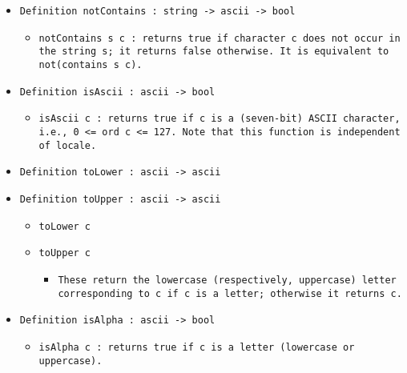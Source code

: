 \documentclass[11pt]{report}
\begin{document}
\begin{itemize}
\item  \texttt{Definition notContains : string -> ascii -> bool}

\begin{itemize}
\item  \begin{flushleft} \texttt{notContains s c : returns true if character c does not occur in the string s; it returns false otherwise. It is equivalent to not(contains s c).} \end{flushleft}
\end{itemize}

\item  \texttt{Definition isAscii : ascii -> bool}

\begin{itemize}
\item  \begin{flushleft} \texttt{isAscii c : returns true if c is a (seven-bit) ASCII character, i.e., 0 <= ord c <= 127. Note that this function is independent of locale.} \end{flushleft}
\end{itemize}

\item  \texttt{Definition toLower : ascii -> ascii}

\item  \texttt{Definition toUpper : ascii -> ascii}

\begin{itemize}
\item  \texttt{toLower c}
\item  \texttt{toUpper c}
\begin{itemize}
\item \begin{flushleft} \texttt{These return the lowercase (respectively, uppercase) letter corresponding to c if c is a letter; otherwise it returns c.} \end{flushleft}
\end{itemize}

\end{itemize}

\item  \texttt{Definition isAlpha : ascii -> bool}

\begin{itemize}
\item  \texttt{isAlpha c :  returns true if c is a letter (lowercase or uppercase).}



\end{itemize}


\end{itemize}
\end{document}
